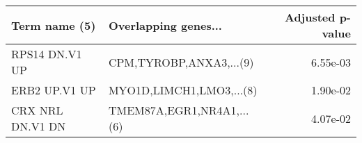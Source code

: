 \begin{tabular}{llr}
\toprule
   Term name (5) &      Overlapping genes... &  Adjusted p-value \\
\midrule
  RPS14 DN.V1 UP &   CPM,TYROBP,ANXA3,...(9) &          6.55e-03 \\
   ERB2 UP.V1 UP &  MYO1D,LIMCH1,LMO3,...(8) &          1.90e-02 \\
CRX NRL DN.V1 DN & TMEM87A,EGR1,NR4A1,...(6) &          4.07e-02 \\
\bottomrule
\end{tabular}
